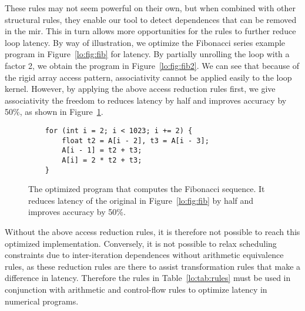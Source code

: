 These rules may not seem powerful on their own, but when combined with other
structural rules, they enable our tool to detect dependences that can be
removed in the \gls{mir}\@.  This in turn allows more opportunities for the
rules to further reduce loop latency.  By way of illustration, we optimize
the Fibonacci series example program in Figure~\ref{lo:fig:fib} for latency.
By partially unrolling the loop with a factor 2, we obtain the program in
Figure~\ref{lo:fig:fib2}.  We can see that because of the rigid array access
pattern, associativity cannot be applied easily to the loop kernel.  However,
by applying the above access reduction rules first, we give associativity the
freedom to reduces latency by half and improves accuracy by 50\%, as shown in
Figure~\ref{lo:lst:fib_opt}.

\begin{figure}[ht]
    \centering
    \begin{lstlisting}
    for (int i = 2; i < 1023; i += 2) {
        float t2 = A[i - 2], t3 = A[i - 3];
        A[i - 1] = t2 + t3;
        A[i] = 2 * t2 + t3;
    }
    \end{lstlisting}
    \caption{%
        The optimized program that computes the Fibonacci sequence.  It reduces
        latency of the original in Figure~\ref{lo:fig:fib} by half and improves
        accuracy by 50\%.
    }\label{lo:lst:fib_opt}
\end{figure}

Without the above access reduction rules, it is therefore not possible to
reach this optimized implementation.  Conversely, it is not possible to
relax scheduling constraints due to inter-iteration dependences without
arithmetic equivalence rules, as these reduction rules are there to assist
transformation rules that make a difference in latency.  Therefore the rules
in Table~\ref{lo:tab:rules} must be used in conjunction with arithmetic and
control-flow rules to optimize latency in numerical programs.
